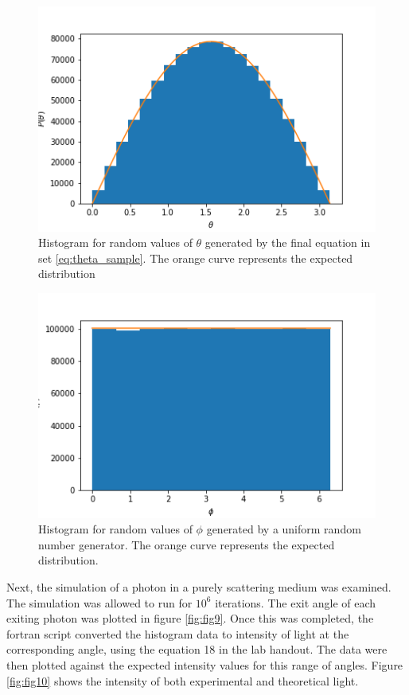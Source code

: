 \documentclass[twocolumn]{article}
\begin{document}
\begin{figure}[t]
\centering
\includegraphics[width=\linewidth]{fig7}
\caption{Histogram for random values of $\theta$ generated by the final equation in set \ref{eq:theta_sample}. The orange curve represents the expected distribution}
\label{fig:fig7}
\end{figure}

\begin{figure}[h]
	\centering
	\includegraphics[width=\linewidth]{fig8}
	\caption{Histogram for random values of $\phi$ generated by a uniform random number generator. The orange curve represents the expected distribution.}
	\label{fig:fig8}
\end{figure}

Next, the simulation of a photon in a purely scattering medium was examined. The simulation was allowed to run for $10^6$ iterations. The exit angle of each exiting photon was plotted in figure \ref{fig:fig9}. Once this was completed, the fortran script converted the histogram data to intensity of light at the corresponding angle, using the equation 18 in the lab handout. The data were then plotted against the expected intensity values for this range of angles. Figure \ref{fig:fig10} shows the intensity of both experimental and theoretical light.
\end{document}
